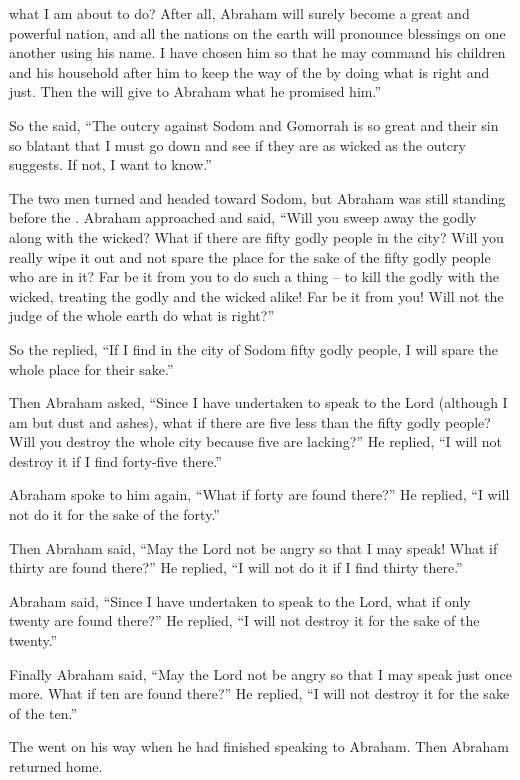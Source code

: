 {what
I
am
about to do?
After all, Abraham
will surely become
a great
and powerful
nation,
and all
the nations
on the earth
will pronounce blessings on one another using his name.
I have chosen
him so that he may command
his children
and his household
after
him to keep
the way
of the {}
by doing
what is right
and just.
Then the
{}
will give
to
Abraham
what
he promised him.”
\par }{\PP {}So the
{}
said,
“The outcry
against Sodom
and Gomorrah
is so
great
and their sin
so blatant
that I must go down
and see
if they are as wicked as the outcry
suggests.
If
not,
I want
to know.”
\par }{\PP {}The two men
turned
and headed
toward Sodom,
but Abraham
was still
standing
before
the {}.
Abraham
approached
and said,
“Will you sweep
away the godly
along with
the wicked?
What if
there
are fifty
godly
people in
the city? Will you really
wipe
it out and not
spare
the place
for
the sake of the fifty
godly
people who are in it?
Far be it
from you to do
such a thing
– to kill
the godly
with
the wicked,
treating the godly
and the wicked
alike! Far be it
from you! Will not
the judge
of the whole
earth
do
what is right?”
\par }{\PP {}So the
{}
replied,
“If
I find
in
the city
of Sodom
fifty
godly
people, I will spare
the whole
place
for their sake.”
\par }{\PP {}Then
Abraham
asked,
“Since
I have undertaken
to speak
to
the Lord
(although I am
but dust
and ashes),
what if
there are five
less
than the fifty
godly
people? Will you destroy
the whole
city
because five are lacking?” He replied,
“I will not
destroy
it if
I find
forty-five
there.”
\par }{\PP {}Abraham
spoke
to him
again, “What if
forty
are found
there?” He replied,
“I will not
do
it for the sake of
the forty.”
\par }{\PP {}Then Abraham said,
“May the Lord
not
be angry
so that I may speak! What if
thirty
are found
there?” He replied,
“I will not
do
it if
I find
thirty
there.”
\par }{\PP {}Abraham said,
“Since I
have undertaken
to speak
to
the Lord,
what if
only twenty
are found
there?” He replied,
“I will not
destroy
it for the sake of
the twenty.”
\par }{\PP {}Finally Abraham said,
“May
the Lord
not
be angry
so that I may speak
just
once
more. What if
ten
are found
there?” He replied,
“I will not
destroy
it for the sake of
the ten.”
\par }{\PP {}The
{}
went
on his way when he had
finished
speaking
to Abraham.
Then Abraham
returned
home.

}
